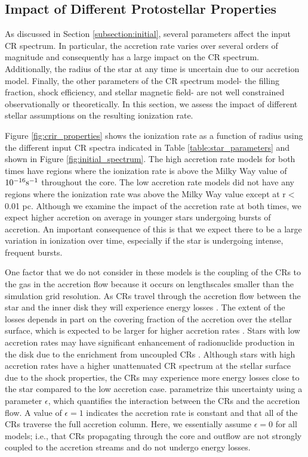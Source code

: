 \documentclass[twocolumn]{aastex63}
\begin{document}
\subsection{Impact of Different Protostellar Properties}
\label{subsection:properties}

As discussed in Section \ref{subsection:initial}, several parameters affect the input CR spectrum. In particular, the accretion rate varies over several orders of magnitude and consequently has a large impact on the CR spectrum. Additionally, the radius of the star at any time is uncertain due to our accretion model. Finally, the other parameters of the CR spectrum model- the filling fraction, shock efficiency, and stellar magnetic field- are not well constrained observationally or theoretically. In this section, we assess the impact of different stellar assumptions on the resulting ionization rate. 

Figure \ref{fig:crir_properties} shows the ionization rate as a function of radius using the different input CR spectra indicated in Table \ref{table:star_parameters} and shown in Figure \ref{fig:initial_spectrum}. The high accretion rate models for both times have regions where the ionization rate is above the Milky Way value of $10^{-16} \rm s^{-1}$ throughout the core. The low accretion rate models did not have any regions where the ionization rate was above the Milky Way value except at r$<$0.01 pc. Although we examine the impact of the accretion rate at both times, we expect higher accretion on average in younger stars undergoing bursts of accretion. An important consequence of this is that we expect there to be a large variation in ionization over time, especially if the star is undergoing intense, frequent bursts.

One factor that we do not consider in these models is the coupling of the CRs to the gas in the accretion flow because it occurs on lengthscales smaller than the simulation grid resolution. As CRs travel through the accretion flow between the star and the inner disk they will experience energy losses \citep{offner_2019_disks}. The extent of the losses depends in part on the covering fraction of the accretion over the stellar surface, which is expected to be larger for higher accretion rates \citep{hartmann_2016_accretion}. Stars with low accretion rates may have significant enhancement of radionuclide production in the disk due to the enrichment from uncoupled CRs \citep{gaches_2020_radionuclide}. Although stars with high accretion rates have a higher unattenuated CR spectrum at the stellar surface due to the shock properties, the CRs may experience more energy losses close to the star compared to the low accretion case. \cite{offner_2019_disks} parametrize this uncertainty using a parameter $\epsilon$, which quantifies the interaction between the CRs and the accretion flow. A value  of $\epsilon=1$ indicates the accretion rate is constant and that all of the CRs traverse the full accretion column. Here, we essentially assume $\epsilon=0$ for all models; i.e., that CRs propagating through the core and outflow are not strongly coupled to the accretion streams and do not undergo energy losses. 
\end{document}
